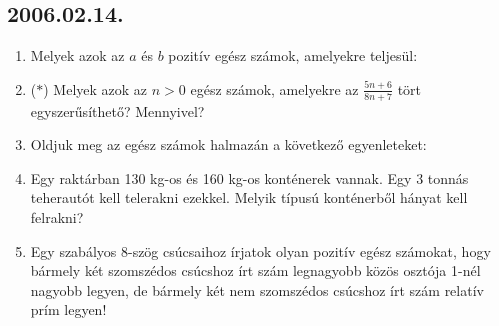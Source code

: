 \subsection*{2006.02.14.}
\begin{enumerate}
\item Melyek azok az $a$ és $b$ pozitív egész számok, amelyekre teljesül:


\item ($*$) Melyek azok az $n>0$ egész számok, amelyekre az $\frac{5n+6}{8n+7}$ tört egyszerűsíthető? Mennyivel?

\item Oldjuk meg az egész számok halmazán a következő egyenleteket:


\item Egy raktárban 130 kg-os és 160 kg-os konténerek vannak. Egy 3 tonnás teherautót kell telerakni ezekkel. Melyik típusú konténerből hányat kell felrakni?

\item Egy szabályos 8-szög csúcsaihoz írjatok olyan pozitív egész számokat, hogy bármely két szomszédos csúcshoz írt szám legnagyobb közös osztója 1-nél nagyobb legyen, de bármely két nem szomszédos csúcshoz írt szám relatív prím legyen!


\end{enumerate}

